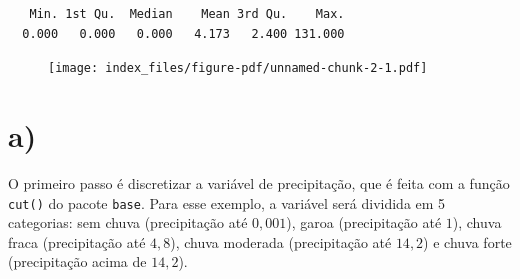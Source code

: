 \documentclass[
  letterpaper,
  DIV=11,
  numbers=noendperiod]{scrreprt}
\newenvironment{Shaded}{\begin{snugshade}}{\end{snugshade}}
\newcommand{\FunctionTok}[1]{\textcolor[rgb]{0.28,0.35,0.67}{#1}}
\newcommand{\NormalTok}[1]{\textcolor[rgb]{0.00,0.23,0.31}{#1}}
\newcommand{\SpecialCharTok}[1]{\textcolor[rgb]{0.37,0.37,0.37}{#1}}
\begin{document}
\begin{verbatim}
   Min. 1st Qu.  Median    Mean 3rd Qu.    Max. 
  0.000   0.000   0.000   4.173   2.400 131.000 
\end{verbatim}

\begin{Shaded}
\end{Shaded}

\begin{figure}[H]

{\centering \texttt{[image: index\_files/figure-pdf/unnamed-chunk-2-1.pdf]}

}

\end{figure}

\hypertarget{a}{%
\section*{a)}\label{a}}


O primeiro passo é discretizar a variável de precipitação, que é feita
com a função \texttt{cut()} do pacote \texttt{base}. Para esse exemplo,
a variável será dividida em 5 categorias: sem chuva (precipitação até
\(0,001\)), garoa (precipitação até \(1\)), chuva fraca (precipitação
até \(4,8\)), chuva moderada (precipitação até \(14,2\)) e chuva forte
(precipitação acima de \(14,2\)).
\end{document}
